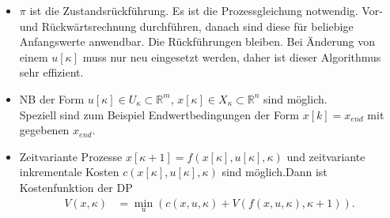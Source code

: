 \begin{remark}\hspace{1mm}
\begin{itemize}
  \item $\pi$ ist die Zustandsrückführung. Es ist die Prozessgleichung notwendig. Vor- und Rückwärtsrechnung durchführen, danach sind diese für beliebige Anfangswerte
  anwendbar. Die Rückführungen bleiben. Bei Änderung von einem $u[\kappa]$ muss nur neu eingesetzt werden, daher ist dieser Algorithmus sehr effizient.
  \item \ac{NB} der Form $u[\kappa]\in U_{\kappa}\subset\mathbb{R}^m$, $x[\kappa]\in X_{\kappa}\subset\mathbb{R}^n$ sind möglich.\\
  Speziell sind zum Beispiel Endwertbedingungen der Form $x[k]=x_{end}$ mit gegebenen $x_{end}$.
  \item Zeitvariante Prozesse $x[\kappa+1]=f(x[\kappa],u[\kappa],\kappa)$ und zeitvariante inkrementale Kosten $c(x[\kappa],u[\kappa],\kappa)$ sind möglich.Dann ist Kostenfunktion der
  \ac{DP}
  \begin{align*}
  	V(x,\kappa) & = \min\limits_u\left(c(x,u,\kappa)+V\left(f(x,u,\kappa), \kappa +1 \right) \right).
  \end{align*}
\end{itemize}
\end{remark}
